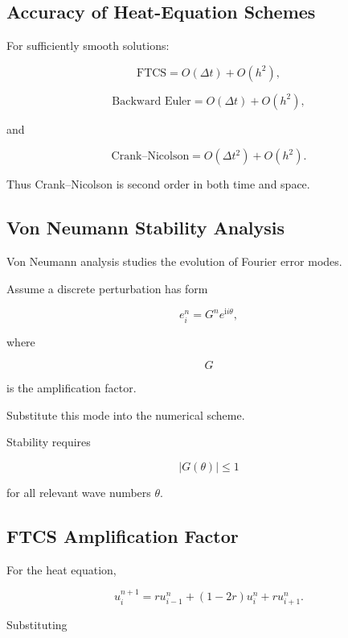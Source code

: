 \subsection{Accuracy of Heat-Equation Schemes}
\label{subsec:heat-scheme-accuracy}

For sufficiently smooth solutions:

\[
\boxed{
\text{FTCS}
=
O(\Delta t)
+
O(h^2),
}
\]

\[
\boxed{
\text{Backward Euler}
=
O(\Delta t)
+
O(h^2),
}
\]

and

\[
\boxed{
\text{Crank--Nicolson}
=
O(\Delta t^2)
+
O(h^2).
}
\]

Thus Crank--Nicolson is second order in both time and space.

\subsection{Von Neumann Stability Analysis}
\label{subsec:von-neumann-analysis}

Von Neumann analysis studies the evolution of Fourier error modes.

Assume a discrete perturbation has form

\[
\boxed{
e_i^n
=
G^n
e^{\mathrm{i}i\theta},
}
\]

where

\[
G
\]

is the amplification factor.

Substitute this mode into the numerical scheme.

Stability requires

\[
\boxed{
|G(\theta)|\leq1
}
\]

for all relevant wave numbers \(\theta\).

\subsection{FTCS Amplification Factor}
\label{subsec:ftcs-amplification-factor}

For the heat equation,

\[
u_i^{n+1}
=
r u_{i-1}^n
+
(1-2r)u_i^n
+
r u_{i+1}^n.
\]

Substituting

